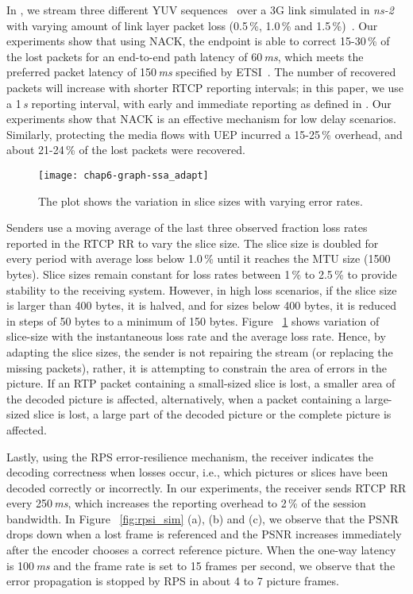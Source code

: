 In , we stream three different YUV sequences~\cite{YUV_seq} over a
3G link simulated in \emph{ns-2}~\cite{ns2} with varying amount of link layer
packet loss (0.5\,\%, 1.0\,\% and 1.5\,\%)~\cite{3gppSim}. Our experiments
show that using NACK, the endpoint is able to correct 15-30\,\% of the lost
packets for an end-to-end path latency of 60\,\emph{ms}, which meets the
preferred  packet latency of 150\,\emph{ms} specified by ETSI~\cite{etsi.qoe}.
The number of recovered packets will increase with shorter RTCP reporting
intervals; in this paper, we use a 1\,\emph{s} reporting interval, with early and
immediate reporting as defined in \cite{rfc4585}. Our experiments show that
NACK is an effective mechanism for low delay scenarios. Similarly, protecting
the media flows with UEP incurred a 15-25\,\% overhead, and about 21-24\,\% of
the lost packets were recovered.

\begin{figure}[!t]
\centerline {
\texttt{[image: chap6-graph-ssa\_adapt]}
}
\caption{The plot shows the variation in slice sizes with varying error
rates.}
\label{fig:ssa_adapt}
\end{figure}

Senders use a moving average of the last three observed fraction loss rates
reported in the RTCP RR to vary the slice size. The slice size is doubled for
every period with average loss below 1.0\,\% until it reaches the MTU size
(1500 bytes). Slice sizes remain constant for loss rates between 1\,\% to
2.5\,\% to provide stability to the receiving system. However, in high loss
scenarios, if the slice size is larger than 400 bytes, it is halved, and for
sizes below 400 bytes, it is reduced in steps of 50 bytes to a minimum of 150
bytes. Figure ~\ref{fig:ssa_adapt} shows variation of slice-size with the
instantaneous loss rate and the average loss rate. Hence, by adapting the
slice sizes, the sender is not repairing the stream (or replacing the missing
packets), rather, it is attempting to constrain the area of errors in the
picture. If an RTP packet containing a small-sized slice is lost, a smaller
area of the decoded picture is affected, alternatively, when a packet
containing a large-sized slice is lost, a large part of the decoded picture
or the complete picture is affected.

Lastly, using the RPS error-resilience mechanism, the receiver indicates the
decoding correctness when losses occur, i.e., which pictures or slices have
been decoded correctly or incorrectly.  In our experiments, the receiver sends
RTCP RR every 250\,\emph{ms}, which increases the reporting overhead to 2\,\%
of the session bandwidth. In Figure ~\ref{fig:rpsi_sim} (a), (b) and (c), we
observe that the PSNR drops down when a lost frame is referenced and the PSNR
increases immediately after the encoder chooses a correct reference picture.
When the one-way latency is 100\,\emph{ms} and the frame rate is set to 15
frames per second, we observe that the error propagation is stopped by RPS in about
4 to 7 picture frames.


